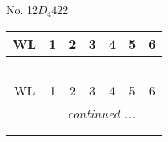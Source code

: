 \documentclass[fleqn,9pt,landscape]{jsarticle}
\begin{document}
\newpage
No. 12\quad$D_{4}$\quad$422$\quad[ tetragonal ]
\begin{center}
\renewcommand{\arraystretch}{1.2}
\begin{longtable}{ccccccc}
 \hline \hline
WL & 1 & 2 & 3 & 4 & 5 & 6 \\ \hline \endfirsthead

\multicolumn{6}{l}{\tablename\ \thetable{}} \\
 \hline \hline
WL & 1 & 2 & 3 & 4 & 5 & 6 \\ \hline \endhead

 \hline \hline
\multicolumn{6}{r}{\footnotesize\it continued ...} \\ \endfoot

 \hline \hline
\multicolumn{6}{r}{} \\ \endlastfoot


\end{longtable}
\end{center}
\end{document}
